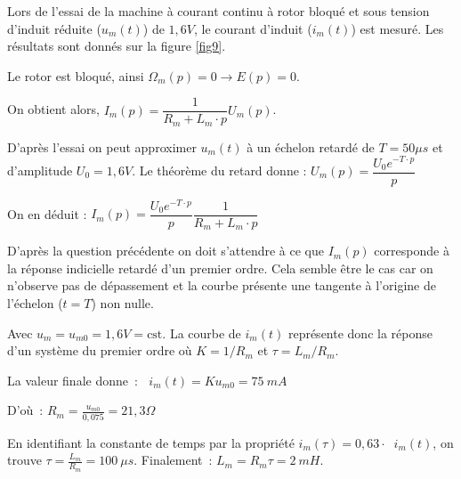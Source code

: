 Lors de l'essai de la machine à courant continu à rotor bloqué et sous tension d'induit réduite ($u_m(t)$) de $1,6 V$, le courant d'induit ($i_m(t)$) est mesuré. Les résultats sont donnés sur la figure \ref{fig9}.

\ifprof
\begin{corrige}
Le rotor est bloqué, ainsi $\Omega_m(p)=0\rightarrow E(p)=0$.

On obtient alors, $I_m(p)=\dfrac{1}{R_m+L_m\cdot p}U_m(p)$.

\end{corrige}
\else
\fi

\ifprof
\begin{corrige}
D'après l'essai on peut approximer $u_m(t)$ à un échelon retardé de $T=50\mu s$ et d'amplitude $U_0=1,6V$.
Le théorème du retard donne :  $U_m(p)=\dfrac{U_0e^{-T\cdot p}}{p}$

On en déduit : 
$I_m(p)=\dfrac{U_0e^{-T\cdot p}}{p}\dfrac{1}{R_m+L_m\cdot p}$

\end{corrige}
\else
\fi


\ifprof
\begin{corrige}
D'après la question précédente on doit s'attendre à ce que $I_m(p)$ corresponde à la réponse indicielle retardé d'un premier ordre. Cela semble être le cas car on n'observe pas de dépassement et la courbe présente une tangente à l'origine de l'échelon ($t=T$) non nulle.

\end{corrige}
\else
\fi


\ifprof
\begin{corrige}
Avec \(u_{m} = u_{m0} = 1,6V = \text{cst}\). La courbe de \(i_{m}(t)\) représente donc la réponse d'un système du premier ordre où
\(K = 1/R_{m}\) et \(\tau = L_{m}/R_{m}\).

La valeur finale donne~: 
\(\operatorname{}{i_{m}(t)} = Ku_{m0} = \SI{75}{mA}\)

D'où~: \(R_{m} = \frac{u_{m0}}{0,075} = 21,3\Omega\)

En identifiant la constante de temps par la propriété \(i_{m}\left( \tau \right) = 0,63 \cdot \operatorname{}{i_{m}(t)}\), on
trouve \(\tau = \frac{L_{m}}{R_{m}} =\SI{100}{\mu s}\). Finalement~:
\(L_{m} = R_{m}\tau = \SI{2}{mH}\).
\end{corrige}
\else
\fi


